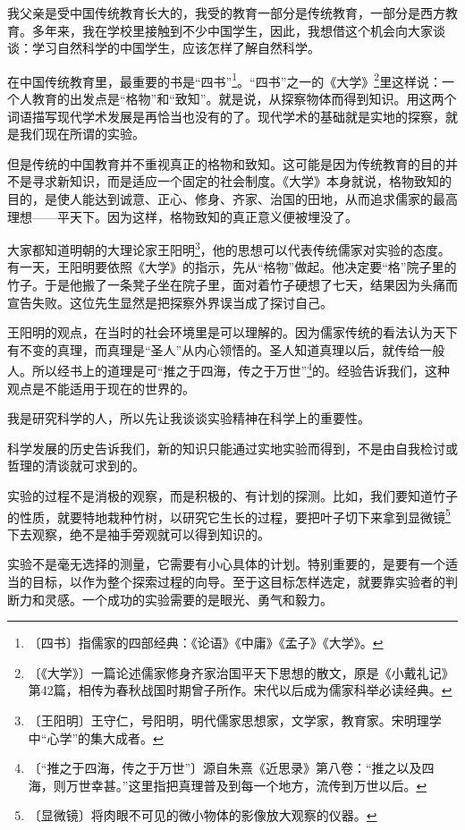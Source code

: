 \documentclass[12pt,UTF-8,openany]{ctexbook}
\begin{document}
\begin{normalsize}
    
    我父亲是受中国传统教育长大的，我受的教育一部分是传统教育，一部分是西方教育。多年来，我在学校里接触到不少中国学生，因此，我想借这个机会向大家谈谈：学习自然科学的中国学生，应该怎样了解自然科学。
    
    在中国传统教育里，最重要的书是“四书”\footnote{〔四书〕指儒家的四部经典：《论语》《中庸》《孟子》《大学》。}。“四书”之一的《大学》\footnote{〔《大学》〕一篇论述儒家修身齐家治国平天下思想的散文，原是《小戴礼记》第42篇，相传为春秋战国时期曾子所作。宋代以后成为儒家科举必读经典。}里这样说：一个人教育的出发点是“格物”和“致知”。就是说，从探察物体而得到知识。用这两个词语描写现代学术发展是再恰当也没有的了。现代学术的基础就是实地的探察，就是我们现在所谓的实验。
    
    但是传统的中国教育并不重视真正的格物和致知。这可能是因为传统教育的目的并不是寻求新知识，而是适应一个固定的社会制度。《大学》本身就说，格物致知的目的，是使人能达到诚意、正心、修身、齐家、治国的田地，从而追求儒家的最高理想——平天下。因为这样，格物致知的真正意义便被埋没了。
    
    大家都知道明朝的大理论家王阳明\footnote{〔王阳明〕王守仁，号阳明，明代儒家思想家，文学家，教育家。宋明理学中“心学”的集大成者。}，他的思想可以代表传统儒家对实验的态度。有一天，王阳明要依照《大学》的指示，先从“格物”做起。他决定要“格”院子里的竹子。于是他搬了一条凳子坐在院子里，面对着竹子硬想了七天，结果因为头痛而宣告失败。这位先生显然是把探察外界误当成了探讨自己。
    
    王阳明的观点，在当时的社会环境里是可以理解的。因为儒家传统的看法认为天下有不变的真理，而真理是“圣人”从内心领悟的。圣人知道真理以后，就传给一般人。所以经书上的道理是可“推之于四海，传之于万世”\footnote{〔“推之于四海，传之于万世”〕源自朱熹《近思录》第八卷：“推之以及四海，则万世幸甚。”这里指把真理普及到每一个地方，流传到万世以后。}的。经验告诉我们，这种观点是不能适用于现在的世界的。
    
    我是研究科学的人，所以先让我谈谈实验精神在科学上的重要性。
    
    科学发展的历史告诉我们，新的知识只能通过实地实验而得到，不是由自我检讨或哲理的清谈就可求到的。
    
    实验的过程不是消极的观察，而是积极的、有计划的探测。比如，我们要知道竹子的性质，就要特地栽种竹树，以研究它生长的过程，要把叶子切下来拿到显微镜\footnote{〔显微镜〕将肉眼不可见的微小物体的影像放大观察的仪器。}下去观察，绝不是袖手旁观就可以得到知识的。
    
    实验不是毫无选择的测量，它需要有小心具体的计划。特别重要的，是要有一个适当的目标，以作为整个探索过程的向导。至于这目标怎样选定，就要靠实验者的判断力和灵感。一个成功的实验需要的是眼光、勇气和毅力。
    

\end{normalsize}
\end{document}
